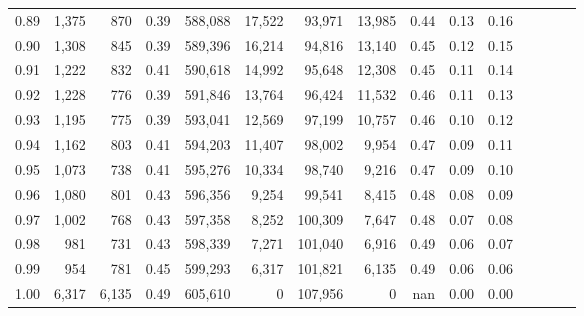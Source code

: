 \begin{tabular}{rrrcrrrrrrrrrrr}
0.89 &   1,375 &    870 &                                       0.39 &  588,088 &   17,522 &   93,971 &   13,985 &  0.44 &  0.13 &                         0.16 \\
0.90 &   1,308 &    845 &                                       0.39 &  589,396 &   16,214 &   94,816 &   13,140 &  0.45 &  0.12 &                         0.15 \\
0.91 &   1,222 &    832 &                                       0.41 &  590,618 &   14,992 &   95,648 &   12,308 &  0.45 &  0.11 &                         0.14 \\
0.92 &   1,228 &    776 &                                       0.39 &  591,846 &   13,764 &   96,424 &   11,532 &  0.46 &  0.11 &                         0.13 \\
0.93 &   1,195 &    775 &                                       0.39 &  593,041 &   12,569 &   97,199 &   10,757 &  0.46 &  0.10 &                         0.12 \\
0.94 &   1,162 &    803 &                                       0.41 &  594,203 &   11,407 &   98,002 &    9,954 &  0.47 &  0.09 &                         0.11 \\
0.95 &   1,073 &    738 &                                       0.41 &  595,276 &   10,334 &   98,740 &    9,216 &  0.47 &  0.09 &                         0.10 \\
0.96 &   1,080 &    801 &                                       0.43 &  596,356 &    9,254 &   99,541 &    8,415 &  0.48 &  0.08 &                         0.09 \\
0.97 &   1,002 &    768 &                                       0.43 &  597,358 &    8,252 &  100,309 &    7,647 &  0.48 &  0.07 &                         0.08 \\
0.98 &     981 &    731 &                                       0.43 &  598,339 &    7,271 &  101,040 &    6,916 &  0.49 &  0.06 &                         0.07 \\
0.99 &     954 &    781 &                                       0.45 &  599,293 &    6,317 &  101,821 &    6,135 &  0.49 &  0.06 &                         0.06 \\
1.00 &   6,317 &  6,135 &                                       0.49 &  605,610 &        0 &  107,956 &        0 &   nan &  0.00 &                         0.00 \\
\bottomrule
\end{tabular}
